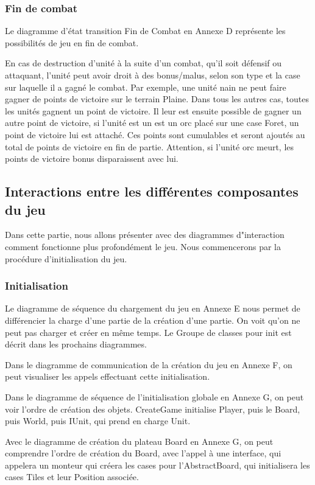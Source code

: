\subsubsection{Fin de combat}

Le diagramme d'état transition Fin de Combat en Annexe D représente les possibilités de jeu en fin de combat. 

En cas de destruction d'unité à la suite d'un combat, qu'il soit défensif ou attaquant, l'unité peut avoir droit à des bonus/malus, selon son type et la case sur laquelle il a gagné le combat. Par exemple, une unité nain ne peut faire gagner de points de victoire sur le terrain Plaine. Dans tous les autres cas, toutes les unités gagnent un point de victoire. Il leur est ensuite possible de gagner un autre point de victoire, si l'unité est un est un orc placé sur une case Foret, un point de victoire lui est attaché. Ces points sont cumulables et seront ajoutés au total de points de victoire en fin de partie. Attention, si l'unité orc meurt, les points de victoire bonus disparaissent avec lui. 

\subsection{Interactions entre les différentes composantes du jeu}

Dans cette partie, nous allons présenter avec des diagrammes d"interaction comment fonctionne plus profondément le jeu. Nous commencerons par la procédure d'initialisation du jeu.
\subsubsection{Initialisation}

Le diagramme de séquence du chargement du jeu en Annexe E nous permet de différencier la charge d'une partie de la création d'une partie. On voit qu'on ne peut pas charger et créer en même temps. Le Groupe de classes pour init est décrit dans les prochains diagrammes.

Dans le diagramme de communication de la création du jeu en Annexe F, on peut visualiser les appels effectuant cette initialisation.

Dans le diagramme de séquence de l'initialisation globale en Annexe G, on peut voir l'ordre de création des objets. CreateGame initialise Player, puis le Board, puis World, puis IUnit, qui prend en charge Unit.

Avec le diagramme de création du plateau Board en Annexe G, on peut comprendre l'ordre de création du Board, avec l'appel à une interface, qui appelera un monteur qui créera les cases pour l'AbstractBoard, qui initialisera les cases Tiles et leur Position associée.

